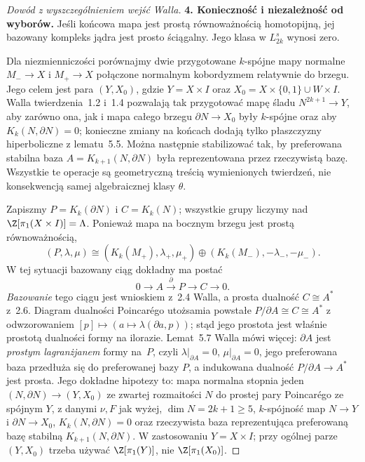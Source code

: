 \begin{proof}[Dowód z wyszczególnieniem wejść Walla]
\textbf{4. Konieczność i niezależność od wyborów.}
Jeśli końcowa mapa jest prostą równoważnością
homotopijną, jej bazowany kompleks jądra jest
prosto ściągalny. Jego klasa w $L^s_{2k}$ wynosi zero.

Dla niezmienniczości porównajmy dwie przygotowane
$k$-spójne mapy normalne $M_-\to X$ i $M_+\to X$
połączone normalnym kobordyzmem relatywnie do brzegu.
Jego celem jest para $(Y,X_0)$, gdzie
$Y=X\times I$ oraz
$X_0=X\times\{0,1\}\cup W\times I$.
Walla twierdzenia~1.2 i~1.4 pozwalają tak przygotować
mapę śladu $N^{2k+1}\to Y$, aby zarówno ona,
jak i mapa całego brzegu $\partial N\to X_0$
były $k$-spójne oraz aby $K_k(N,\partial N)=0$;
konieczne
zmiany na końcach dodają tylko płaszczyzny
hiperboliczne z lematu~5.5. Można następnie
stabilizować tak, by preferowana stabilna baza
$A=K_{k+1}(N,\partial N)$ była reprezentowana
przez rzeczywistą bazę. Wszystkie te operacje
są geometryczną treścią wymienionych twierdzeń,
nie konsekwencją samej algebraicznej klasy $\theta$.

Zapiszmy $P=K_k(\partial N)$ i $C=K_k(N)$;
wszystkie grupy liczymy nad
$\Z[\pi_1(X\times I)]=\Lambda$. Ponieważ
mapa na bocznym brzegu jest prostą równoważnością,
\[
 (P,\lambda,\mu)
  \cong (K_k(M_+),\lambda_+,\mu_+)
       \oplus(K_k(M_-),-\lambda_-,-\mu_-).
\]
W tej sytuacji bazowany ciąg dokładny ma postać
\begin{equation}\label{eq:Wall-parz-lagr-ciag-22}
 0\longrightarrow A\xrightarrow{\,\partial\,}P
   \longrightarrow C\longrightarrow0.
\end{equation}
\emph{Bazowanie} tego ciągu jest wnioskiem z~2.4
Walla, a prosta dualność $C\cong A^*$ z~2.6.
Diagram dualności Poincarégo utożsamia powstałe
$P/\partial A\cong C\cong A^*$ z odwzorowaniem
$[p]\mapsto(a\mapsto\lambda(\partial a,p))$;
stąd jego prostota jest właśnie prostotą
dualności formy na ilorazie.
Lemat~5.7 Walla mówi więcej: $\partial A$ jest
\emph{prostym lagranżjanem} formy na~$P$,
czyli $\lambda|_{\partial A}=0$,
$\mu|_{\partial A}=0$, jego preferowana baza
przedłuża się do preferowanej bazy $P$,
a indukowana dualność $P/\partial A\to A^*$
jest prosta. Jego dokładne hipotezy to: mapa normalna
stopnia jeden $(N,\partial N)\to(Y,X_0)$ ze zwartej
rozmaitości $N$ do prostej pary Poincarégo ze
spójnym $Y$, z danymi $\nu,F$ jak wyżej,
$\dim N=2k+1\geq5$, $k$-spójność map
$N\to Y$ i $\partial N\to X_0$,
$K_k(N,\partial N)=0$ oraz rzeczywista baza
reprezentująca preferowaną bazę stabilną
$K_{k+1}(N,\partial N)$. W zastosowaniu
$Y=X\times I$; przy ogólnej parze $(Y,X_0)$
trzeba używać $\Z[\pi_1(Y)]$, nie
$\Z[\pi_1(X_0)]$.


\end{proof}
